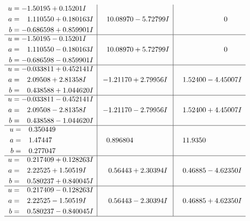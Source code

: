 \documentclass[1p]{elsarticle_modified}
\theoremstyle{definition}
\begin{document}
$$\begin{array}{c|c|c}
\begin{aligned}
u &= -1.50195 + 0.15201 I \\
a &= \phantom{-}1.110550 + 0.180163 I \\
b &= -0.686598 + 0.859901 I\end{aligned}
 & \phantom{-}10.08970 - 5.72799 I & \phantom{-0.000000 } 0 \\ \hline\begin{aligned}
u &= -1.50195 - 0.15201 I \\
a &= \phantom{-}1.110550 - 0.180163 I \\
b &= -0.686598 - 0.859901 I\end{aligned}
 & \phantom{-}10.08970 + 5.72799 I & \phantom{-0.000000 } 0 \\ \hline\begin{aligned}
u &= -0.033811 + 0.452141 I \\
a &= \phantom{-}2.09508 + 2.81358 I \\
b &= \phantom{-}0.438588 + 1.044620 I\end{aligned}
 & -1.21170 + 2.79956 I & \phantom{-}1.52400 - 4.45007 I \\ \hline\begin{aligned}
u &= -0.033811 - 0.452141 I \\
a &= \phantom{-}2.09508 - 2.81358 I \\
b &= \phantom{-}0.438588 - 1.044620 I\end{aligned}
 & -1.21170 - 2.79956 I & \phantom{-}1.52400 + 4.45007 I \\ \hline\begin{aligned}
u &= \phantom{-}0.350449\phantom{ +0.000000I} \\
a &= \phantom{-}1.47447\phantom{ +0.000000I} \\
b &= \phantom{-}0.277047\phantom{ +0.000000I}\end{aligned}
 & \phantom{-}0.896804\phantom{ +0.000000I} & \phantom{-}11.9350\phantom{ +0.000000I} \\ \hline\begin{aligned}
u &= \phantom{-}0.217409 + 0.128263 I \\
a &= \phantom{-}2.22525 + 1.50519 I \\
b &= \phantom{-}0.580237 + 0.840045 I\end{aligned}
 & \phantom{-}0.56443 + 2.30394 I & \phantom{-}0.46885 - 4.62350 I \\ \hline\begin{aligned}
u &= \phantom{-}0.217409 - 0.128263 I \\
a &= \phantom{-}2.22525 - 1.50519 I \\
b &= \phantom{-}0.580237 - 0.840045 I\end{aligned}
 & \phantom{-}0.56443 - 2.30394 I & \phantom{-}0.46885 + 4.62350 I\\
 \hline 
 \end{array}$$\newpage\newpage\renewcommand{\arraystretch}{1}
\end{document}
